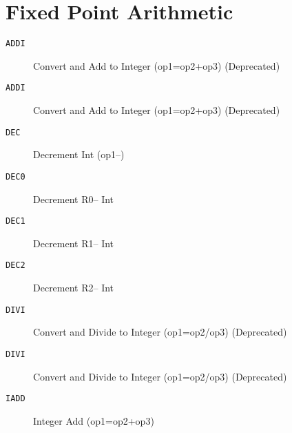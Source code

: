 \section{Fixed Point Arithmetic}
\begin{description}
\item[\texttt{ADDI}]  Convert and Add to Integer (op1=op2+op3) (Deprecated)\\

\end{description}
\begin{description}
\item[\texttt{ADDI}]  Convert and Add to Integer (op1=op2+op3) (Deprecated)\\

\end{description}
\begin{description}
\item[\texttt{DEC}]  Decrement Int (op1--)\\

\end{description}
\begin{description}
\item[\texttt{DEC0}]  Decrement R0-- Int\\

\end{description}
\begin{description}
\item[\texttt{DEC1}]  Decrement R1-- Int\\

\end{description}
\begin{description}
\item[\texttt{DEC2}]  Decrement R2-- Int\\

\end{description}
\begin{description}
\item[\texttt{DIVI}]  Convert and Divide to Integer (op1=op2/op3) (Deprecated)\\

\end{description}
\begin{description}
\item[\texttt{DIVI}]  Convert and Divide to Integer (op1=op2/op3) (Deprecated)\\

\end{description}
\begin{description}
\item[\texttt{IADD}]  Integer Add (op1=op2+op3)\\

\end{description}
